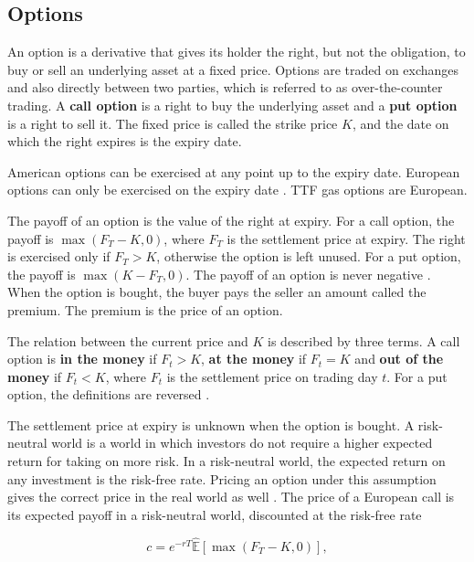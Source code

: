 \subsection{Options}\label{sec:options}
An option is a derivative that gives its holder the right, but not the obligation, to buy or sell an underlying asset at a fixed price. Options are traded on exchanges and also directly between two parties, which is referred to as over-the-counter trading. A \textbf{call option} is a right to buy the underlying asset and a \textbf{put option} is a right to sell it. The fixed price is called the strike price $K$, and the date on which the right expires is the expiry date. 

American options can be exercised at any point up to the expiry date. European options can only be exercised on the expiry date \parencite[31]{hullOptionsFuturesOther2022}. TTF gas options are European.

The payoff of an option is the value of the right at expiry. For a call option, the payoff is $\max(F_T - K, 0)$, where $F_T$ is the settlement price at expiry. The right is exercised only if $F_T > K$, otherwise the option is left unused.
For a put option, the payoff is $\max(K - F_T, 0)$. The payoff of an option is never negative \parencite[231]{hullOptionsFuturesOther2022}. When the option is bought, the buyer pays the seller an amount called the premium. The premium is the price of an option.

The relation between the current price and $K$ is described by three terms. A call option is \textbf{in the money} if $F_t > K$, \textbf{at the money} if $F_t = K$ and \textbf{out of the money} if $F_t < K$, where $F_t$ is the settlement price on trading day $t$. For a put option, the definitions are reversed \parencite[234]{hullOptionsFuturesOther2022}.

The settlement price at expiry is unknown when the option is bought. A risk-neutral world is a world in which investors do not require a higher expected return for taking on more risk. In a risk-neutral world, the expected return on any investment is the risk-free rate. Pricing an option under this assumption gives the correct price in the real world as well \parencite[292]{hullOptionsFuturesOther2022}. The price of a European call is its expected payoff in a risk-neutral world, discounted at the risk-free rate

\begin{equation}
    c = e^{-r T} \hat{\mathbb{E}}[\max(F_T - K, 0)],
    \label{eq:price-call}
\end{equation}

